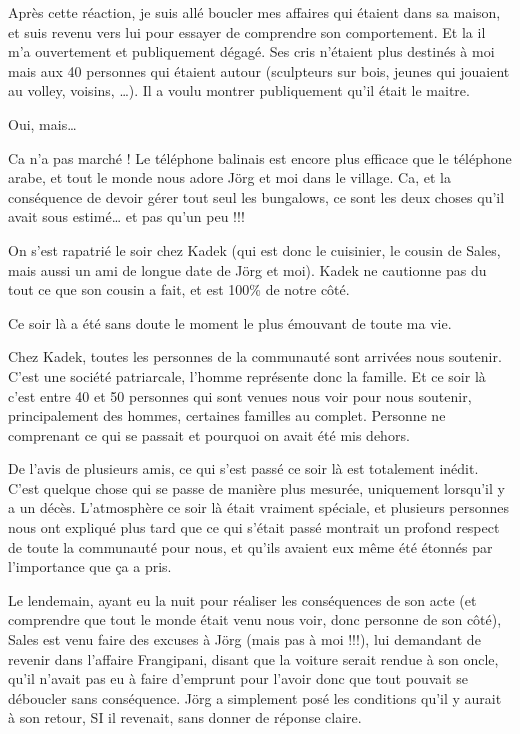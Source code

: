 Après cette réaction, je suis allé boucler mes affaires qui étaient dans sa maison, et suis revenu vers lui pour essayer de comprendre son comportement. Et la il m’a ouvertement et publiquement dégagé. Ses cris n’étaient plus destinés à moi mais aux 40 personnes qui étaient autour (sculpteurs sur bois, jeunes qui jouaient au volley, voisins, …). Il a voulu montrer publiquement qu’il était le maitre.

Oui, mais…

Ca n’a pas marché ! Le téléphone balinais est encore plus efficace que le téléphone arabe, et tout le monde nous adore Jörg et moi dans le village. Ca, et la conséquence de devoir gérer tout seul les bungalows, ce sont les deux choses qu’il avait sous estimé… et pas qu’un peu !!!

On s’est rapatrié le soir chez Kadek (qui est donc le cuisinier, le cousin de Sales, mais aussi un ami de longue date de Jörg et moi). Kadek ne cautionne pas du tout ce que son cousin a fait, et est 100\% de notre côté.

Ce soir là a été sans doute le moment le plus émouvant de toute ma vie.

Chez Kadek, toutes les personnes de la communauté sont arrivées nous soutenir. C’est une société patriarcale, l’homme représente donc la famille. Et ce soir là c’est entre 40 et 50 personnes qui sont venues nous voir pour nous soutenir, principalement des hommes, certaines familles au complet. Personne ne comprenant ce qui se passait et pourquoi on avait été mis dehors.

De l’avis de plusieurs amis, ce qui s’est passé ce soir là est totalement inédit. C’est quelque chose qui se passe de manière plus mesurée, uniquement lorsqu’il y a un décès. L’atmosphère ce soir là était vraiment spéciale, et plusieurs personnes nous ont expliqué plus tard que ce qui s’était passé montrait un profond respect de toute la communauté pour nous, et qu’ils avaient eux même été étonnés par l’importance que ça a pris.

Le lendemain, ayant eu la nuit pour réaliser les conséquences de son acte (et comprendre que tout le monde était venu nous voir, donc personne de son côté), Sales est venu faire des excuses à Jörg (mais pas à moi !!!), lui demandant de revenir dans l’affaire Frangipani, disant que la voiture serait rendue à son oncle, qu’il n’avait pas eu à faire d’emprunt pour l’avoir donc que tout pouvait se déboucler sans conséquence. Jörg a simplement posé les conditions qu’il y aurait à son retour, SI il revenait, sans donner de réponse claire.


